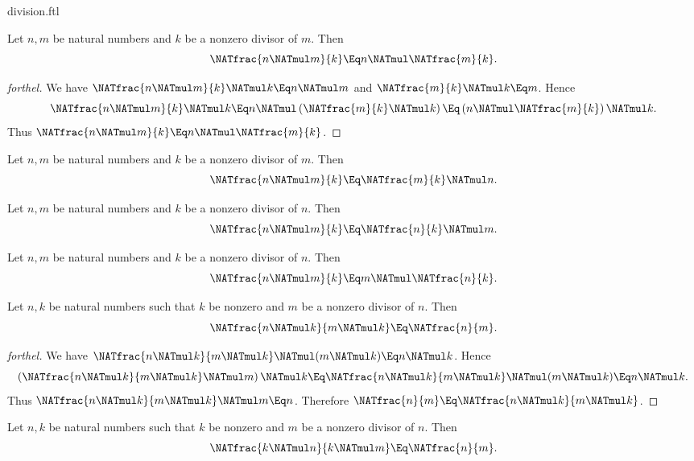 \documentclass{stex}
\begin{document}
\begin{smodule}{division.ftl}
\begin{proposition}[forthel,id=ARITHMETIC_14_1203565412058488]
  Let $n, m$ be natural numbers and $k$ be a nonzero divisor of $m$.
  Then \[\NATfrac{n \NATmul m}{k} \Eq n \NATmul \NATfrac{m}{k}.\]
\end{proposition}
\begin{proof}[forthel]
  We have $\NATfrac{n \NATmul m}{k} \NATmul k \Eq n \NATmul m$ and $\NATfrac{m}{k} \NATmul k \Eq m$.
  Hence
  \[  \NATfrac{n \NATmul m}{k} \NATmul k
      \Eq n \NATmul \left( \NATfrac{m}{k} \NATmul k \right)
      \Eq \left( n \NATmul \NATfrac{m}{k} \right) \NATmul k. \]
  Thus $\NATfrac{n \NATmul m}{k} \Eq n \NATmul \NATfrac{m}{k}$.
\end{proof}

\begin{corollary}[forthel,id=ARITHMETIC_14_7985412544563256]
  Let $n, m$ be natural numbers and $k$ be a nonzero divisor of $m$.
  Then \[\NATfrac{n \NATmul m}{k} \Eq \NATfrac{m}{k} \NATmul n.\]
\end{corollary}

\begin{corollary}[forthel,id=ARITHMETIC_14_5446124202158602]
  Let $n, m$ be natural numbers and $k$ be a nonzero divisor of $n$.
  Then \[\NATfrac{n \NATmul m}{k} \Eq \NATfrac{n}{k} \NATmul m.\]
\end{corollary}

\begin{corollary}[forthel,id=ARITHMETIC_14_7751120023654896]
  Let $n, m$ be natural numbers and $k$ be a nonzero divisor of $n$.
  Then \[\NATfrac{n \NATmul m}{k} \Eq m \NATmul \NATfrac{n}{k}.\]
\end{corollary}

\begin{proposition}[forthel,id=ARITHMETIC_14_0531254868745988]
  Let $n, k$ be natural numbers such that $k$ be nonzero and $m$ be a nonzero divisor of $n$.
  Then \[\NATfrac{n \NATmul k}{m \NATmul k} \Eq \NATfrac{n}{m}.\]
\end{proposition}
\begin{proof}[forthel]
  We have $\NATfrac{n \NATmul k}{m \NATmul k} \NATmul (m \NATmul k) \Eq n \NATmul k$.
  Hence
  \[  \left( \NATfrac{n \NATmul k}{m \NATmul k} \NATmul m \right) \NATmul k
      \Eq \NATfrac{n \NATmul k}{m \NATmul k} \NATmul (m \NATmul k)
      \Eq n \NATmul k. \]
  Thus $\NATfrac{n \NATmul k}{m \NATmul k} \NATmul m \Eq n$.
  Therefore $\NATfrac{n}{m} \Eq \NATfrac{n \NATmul k}{m \NATmul k}$.
\end{proof}

\begin{corollary}[forthel,id=ARITHMETIC_14_7954254458622034]
  Let $n, k$ be natural numbers such that $k$ be nonzero and $m$ be a nonzero divisor of $n$.
  Then \[\NATfrac{k \NATmul n}{k \NATmul m} \Eq \NATfrac{n}{m}.\]
\end{corollary}
\end{smodule}
\end{document}
